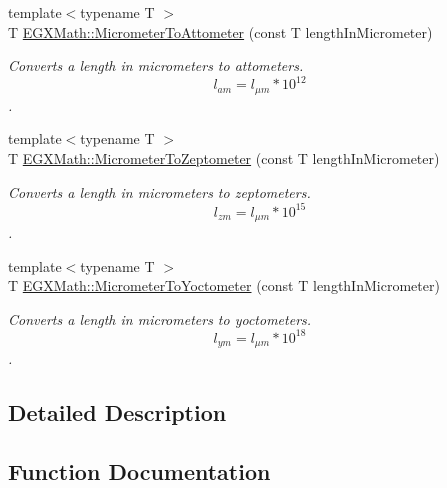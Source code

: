 \begin{DoxyCompactItemize}
{\footnotesize template$<$typename T $>$ }\\T \mbox{\hyperlink{group___e_g_x_math-_conversions-_length_conversions-_micrometer-_s_i_ga296eef01f570febc71c616741e02e561}{E\+G\+X\+Math\+::\+Micrometer\+To\+Attometer}} (const T length\+In\+Micrometer)
\begin{DoxyCompactList}\small\item\em Converts a length in micrometers to attometers. \[ l_{am}=l_{\mu m} * 10^{12} \]. \end{DoxyCompactList}\item 
{\footnotesize template$<$typename T $>$ }\\T \mbox{\hyperlink{group___e_g_x_math-_conversions-_length_conversions-_micrometer-_s_i_ga34a06da7fb2b2f8791f5beefd4727be8}{E\+G\+X\+Math\+::\+Micrometer\+To\+Zeptometer}} (const T length\+In\+Micrometer)
\begin{DoxyCompactList}\small\item\em Converts a length in micrometers to zeptometers. \[ l_{zm}=l_{\mu m} * 10^{15} \]. \end{DoxyCompactList}\item 
{\footnotesize template$<$typename T $>$ }\\T \mbox{\hyperlink{group___e_g_x_math-_conversions-_length_conversions-_micrometer-_s_i_ga58e346f8863d6679fecc09c55e253116}{E\+G\+X\+Math\+::\+Micrometer\+To\+Yoctometer}} (const T length\+In\+Micrometer)
\begin{DoxyCompactList}\small\item\em Converts a length in micrometers to yoctometers. \[ l_{ym}=l_{\mu m} * 10^{18} \]. \end{DoxyCompactList}\end{DoxyCompactItemize}


\subsection{Detailed Description}


\subsection{Function Documentation}
\mbox{\label{group___e_g_x_math-_conversions-_length_conversions-_micrometer-_s_i_ga296eef01f570febc71c616741e02e561}} 
